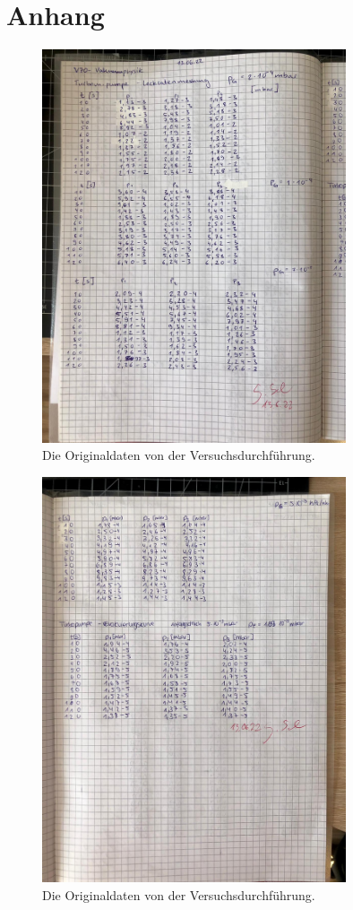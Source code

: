 \newpage
\section{Anhang}
\label{sec:anhang}

\begin{figure}
    \centering
    \includegraphics[width=0.8\textwidth]{bilder/Anhang1.jpg}
    \caption{Die Originaldaten von der Versuchsdurchführung.}
    \label{fig:originaldaten1}
\end{figure}
\begin{figure}
    \centering
    \includegraphics[width=0.8\textwidth]{bilder/Anhang2.jpg}
    \caption{Die Originaldaten von der Versuchsdurchführung.}
    \label{fig:originaldaten2}
\end{figure}
